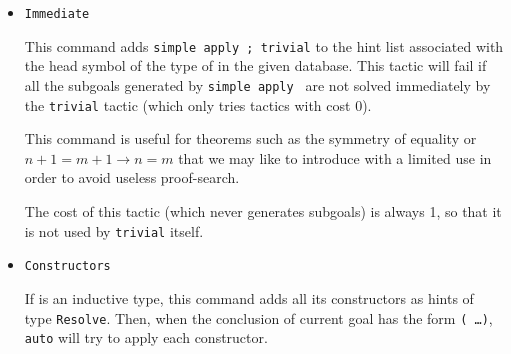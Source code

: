 \begin{coq_example*}
\begin{itemize}

\item \texttt{Immediate {\term}}

  This command adds {\tt simple apply {\term}; trivial} to the hint list
  associated with the head symbol of the type of {\ident} in the given
  database. This tactic will fail if all the subgoals generated by
  {\tt simple apply {\term}} are not solved immediately by the {\tt trivial}
  tactic (which only tries tactics with cost $0$).

  This command is useful for theorems such as the symmetry of equality
  or $n+1=m+1 \to n=m$ that we may like to introduce with a
  limited use in order to avoid useless proof-search.

  The cost of this tactic (which never generates subgoals) is always 1,
  so that it is not used by {\tt trivial} itself.



\item \texttt{Constructors} {\ident}

  If {\ident} is an inductive type, this command adds all its
  constructors as hints of type \texttt{Resolve}. Then, when the
  conclusion of current goal has the form \texttt{({\ident} \dots)},
  \texttt{auto} will try to apply each constructor.

  \begin{ErrMsgs}


\end{ErrMsgs}
\end{itemize}
\end{coq_example*}
